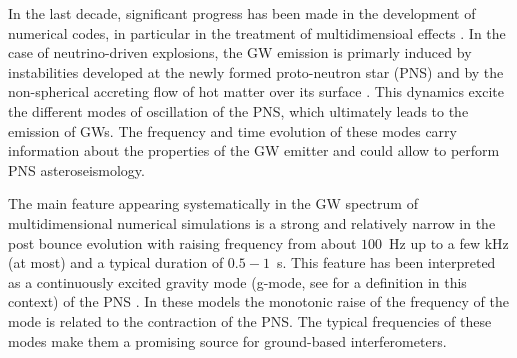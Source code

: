 In the last decade, significant progress has been made in the development of numerical codes, {in particular in the treatment of multidimensioal effects \citep{BMueller:2020}.}
In the case of  neutrino-driven explosions, the GW emission is {primarly induced by instabilities developed at the newly formed proto-neutron star (PNS) and by the non-spherical accreting flow of hot matter over its surface \citep{Kotake:2017}.  This} dynamics excite the different modes of oscillation of the PNS{, which ultimately leads to the emission of GWs. The frequency and time evolution of these modes carry information about the
properties of the GW emitter and could allow to perform PNS asteroseismology. }




{The main feature appearing systematically in the GW spectrum of multidimensional numerical simulations is a strong and relatively narrow  in the post bounce evolution with raising frequency
from about $100$~Hz up to a few kHz (at most) and a typical duration of $0.5-1$~s. This feature has been interpreted as a continuously excited gravity mode (g-mode, see \citep{kokkotas,Friedman:2013} for a definition in this context) of the PNS \citep{murphy:09, mueller:13gw, Cerda:2013, Yakunin:2015, Kuroda:2016, Andresen:2017}. In these models the monotonic raise of the frequency of the mode is related to the contraction of the PNS.} The {typical} frequencies of {these} modes make them {a} promising {source} for ground-based interferometers. 
 
